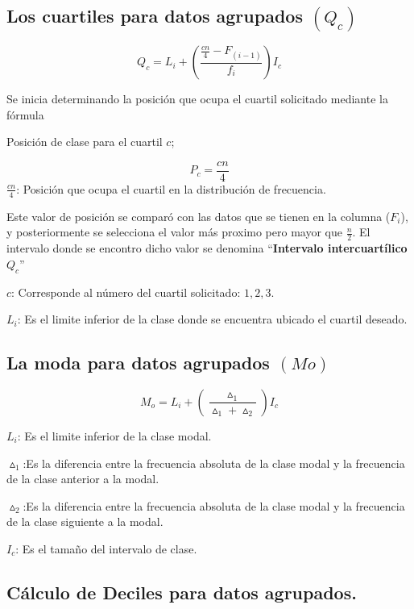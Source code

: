 \documentclass[
]{book}
\theoremstyle{definition}
\theoremstyle{definition}
\theoremstyle{definition}
\theoremstyle{definition}
\theoremstyle{remark}
\begin{document}
\hypertarget{los-cuartiles-para-datos-agrupados-q_c}{%
\subsection{\texorpdfstring{Los cuartiles para datos agrupados \((Q_c)\)}{Los cuartiles para datos agrupados (Q\_c)}}\label{los-cuartiles-para-datos-agrupados-q_c}}

\[Q_c=L_{i}+\left( \dfrac{\frac{cn}{4}-F_{(i-1)}}{f_{i}}\right) I_c\]

Se inicia determinando la posición que ocupa el cuartil solicitado mediante la fórmula

Posición de clase para el cuartil \(c\);

\[
P_{c}=\dfrac{cn}{4}
\]
\(\frac{cn}{4}\): Posición que ocupa el cuartil en la distribución de frecuencia.

Este valor de posición se comparó con las datos que se tienen en la columna (\textbf{\(F_i\)}), y posteriormente se selecciona el valor más proximo pero mayor que \(\frac{n}{2}\). El intervalo donde se encontro dicho valor se denomina ``\textbf{Intervalo intercuartílico \(Q_c\)}''

\(c\): Corresponde al número del cuartil solicitado: \(1,2,3\).

\(L_{i}\): Es el limite inferior de la clase donde se encuentra ubicado el cuartil deseado.

\hypertarget{la-moda-para-datos-agrupados-mo}{%
\subsection{\texorpdfstring{La moda para datos agrupados \((Mo)\)}{La moda para datos agrupados (Mo)}}\label{la-moda-para-datos-agrupados-mo}}

\[
M_{o}=L_{i}+\left( \dfrac{\vartriangle_{1}}{\vartriangle_{1}+\vartriangle_{2}}\right) I_c
\]

\(L_{i}\): Es el limite inferior de la clase modal.

\(\vartriangle_{1}\):Es la diferencia entre la frecuencia absoluta de la clase modal y la frecuencia de la clase anterior a la modal.

\(\vartriangle_{2}\):Es la diferencia entre la frecuencia absoluta de la clase modal y la frecuencia de la clase siguiente a la modal.

\(I_{c}\): Es el tamaño del intervalo de clase.

\hypertarget{cuxe1lculo-de-deciles-para-datos-agrupados.}{%
\subsection{Cálculo de Deciles para datos agrupados.}\label{cuxe1lculo-de-deciles-para-datos-agrupados.}}
\end{document}
